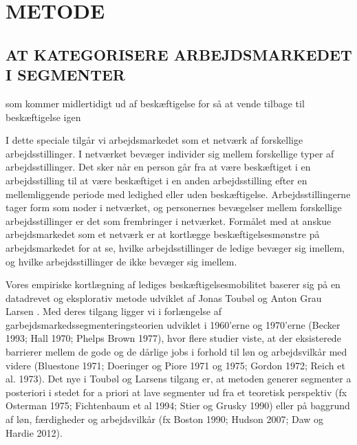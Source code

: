 

\chapter{METODE} \label{metode}




\section{AT KATEGORISERE ARBEJDSMARKEDET I SEGMENTER \label{disco_intro}}

som kommer midlertidigt ud af beskæftigelse for så at vende tilbage til beskæftigelse igen

I dette speciale tilgår vi arbejdsmarkedet som et netværk af forskellige arbejdsstillinger. I netværket bevæger individer sig mellem forskellige typer af arbejdsstillinger. Det sker når en person går fra at være beskæftiget i en arbejdsstilling til at være beskæftiget i en anden arbejdsstilling efter en mellemliggende periode med ledighed eller uden beskæftigelse. Arbejdsstillingerne tager form som noder i netværket, og personernes bevægelser mellem forskellige arbejdsstillinger er det som frembringer  i netværket. Formålet med at anskue arbejdsmarkedet som et netværk er at kortlægge beskæftigelsesmønstre på arbejdsmarkedet for at se, hvilke arbejdsstillinger de ledige bevæger sig imellem, og hvilke arbejdsstillinger de ikke bevæger sig imellem.

Vores empiriske kortlægning af lediges beskæftigelsesmobilitet baserer sig på en datadrevet og eksplorativ metode udviklet af Jonas Toubøl og Anton Grau Larsen \parencite{TouboelLarsenJensen2013, TouboelLarsen2015}. Med deres tilgang ligger vi i forlængelse af  garbejdsmarkedssegmenteringsteorien udviklet i 1960'erne og 1970'erne (Becker 1993; Hall 1970; Phelps Brown 1977), hvor flere studier viste, at der eksisterede barrierer mellem de gode og de dårlige jobs i forhold til løn og arbejdsvilkår med videre (Bluestone 1971; Doeringer og Piore 1971 og 1975; Gordon 1972; Reich et al. 1973). Det nye i Toubøl og Larsens tilgang er, at metoden generer segmenter a posteriori i stedet for a priori at lave segmenter ud fra et teoretisk perspektiv (fx Osterman 1975; Fichtenbaum et al 1994; Stier og Grusky 1990) eller på baggrund af løn, færdigheder og arbejdsvilkår (fx Boston 1990; Hudson 2007; Daw og Hardie 2012).

